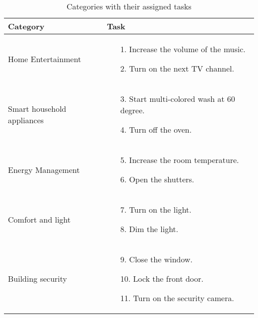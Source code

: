 \documentclass[sigchi]{acmart}
\begin{document}
\begin{table}[t]
\caption{Categories with their assigned tasks}
\label{tab:tasks}
\begin{small}
\begin{tabular}{p{} p{}} \toprule
\textbf{Category}			& \textbf{Task} \\ \midrule
Home Entertainment         	& \begin{itemize}
							 \item[1.] Increase the volume of the music.
							 \item[2.] Turn on the next TV channel.  
							 \end{itemize} \\ \midrule
Smart household appliances 	& \begin{itemize}
							 \item[3.] Start multi-colored wash at 60 degree.
							 \item[4.] Turn off the oven.   
							 \end{itemize} \\ \midrule
Energy Management          	& \begin{itemize}
							 \item[5.] Increase the room temperature.   
							 \item[6.] Open the shutters.    
							 \end{itemize} \\ \midrule
Comfort and light          	& \begin{itemize}
							 \item[7.] Turn on the light.      
							 \item[8.] Dim the light.          
							 \end{itemize} \\ \midrule
Building security          	& \begin{itemize}
							 \item[9.] Close the window.     
							 \item[10.] Lock the front door. 
							 \item[11.]  Turn on the security camera.
							 \end{itemize} \\ \bottomrule

\end{tabular}
\end{small}
\end{table}
\end{document}
